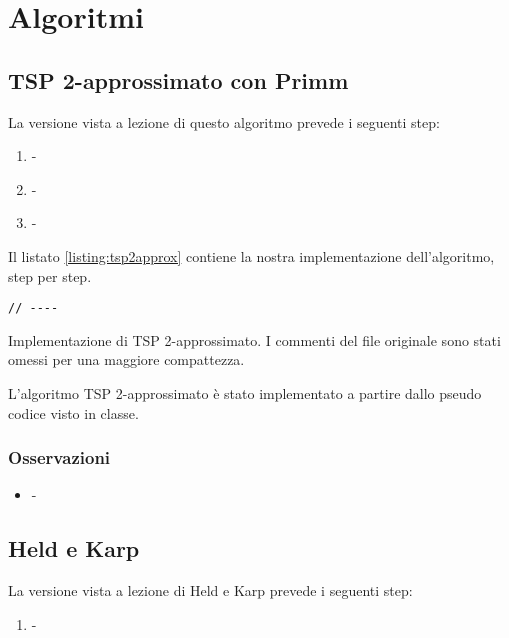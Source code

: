 
\section{Algoritmi}
\label{cap:algorithms}

\subsection{TSP 2-approssimato con Primm}

La versione vista a lezione di questo algoritmo prevede i seguenti step:

\begin{enumerate}
    \item -
    \item -
    \item -
\end{enumerate}

\noindent Il listato \ref{listing:tsp2approx} contiene la nostra implementazione dell'algoritmo, step per step.\\

\begin{listing}[!ht]
\begin{verbatim}
// ----

\end{verbatim}
\caption{Implementazione di TSP 2-approssimato. I commenti del file originale sono stati omessi per una maggiore compattezza.}
\label{listing:tsp2approx}
\end{listing}

\noindent L'algoritmo TSP 2-approssimato è stato implementato a partire dallo pseudo codice visto in classe. \\

\subsubsection{Osservazioni}

\begin{itemize}
    \item -
\end{itemize}


\subsection{Held e Karp}

La versione vista a lezione di Held e Karp prevede i seguenti step:

\begin{enumerate}
    \item -
\end{enumerate}

